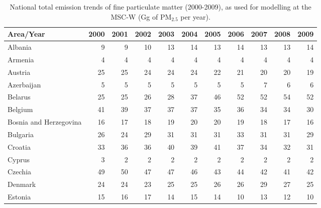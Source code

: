  \begin{table}
 \caption{National total emission trends of  fine particulate matter (2000-2009), as used for modelling at the MSC-W (Gg of PM$_{2.5}$ per year).}
 
 \vspace{15pt}
 
 \scriptsize
 \centering
 \begin{tabular}{|l|r|r|r|r|r|r|r|r|r|r|}
 \hline
                     Area/Year&   2000&   2001&   2002&   2003&   2004&   2005&   2006&   2007&   2008&   2009\\\hline\hline
                       Albania&      9&      9&     10&     13&     14&     13&     14&     13&     13&     14\\\hline
                       Armenia&      4&      4&      4&      4&      4&      4&      4&      4&      4&      4\\\hline
                       Austria&     25&     25&     24&     24&     24&     22&     21&     20&     20&     19\\\hline
                    Azerbaijan&      5&      5&      5&      5&      5&      5&      5&      7&      6&      6\\\hline
                       Belarus&     25&     25&     26&     28&     37&     46&     52&     52&     54&     52\\\hline
                       Belgium&     41&     39&     37&     37&     37&     35&     36&     34&     34&     30\\\hline
        Bosnia and Herzegovina&     16&     17&     18&     19&     20&     20&     19&     18&     17&     16\\\hline
                      Bulgaria&     26&     24&     29&     31&     31&     31&     33&     31&     31&     29\\\hline
                       Croatia&     33&     36&     36&     40&     39&     41&     37&     34&     32&     31\\\hline
                        Cyprus&      3&      2&      2&      2&      2&      2&      2&      2&      2&      2\\\hline
                       Czechia&     49&     50&     47&     47&     46&     43&     44&     42&     41&     42\\\hline
                       Denmark&     24&     24&     23&     25&     25&     26&     26&     29&     27&     25\\\hline
                       Estonia&     15&     16&     17&     14&     15&     14&     10&     13&     12&     10\\\hline

\end{tabular}
\end{table}
